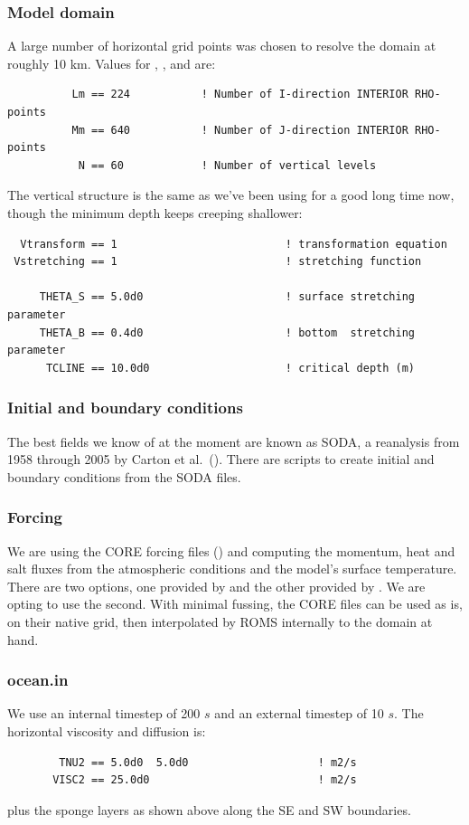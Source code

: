 \subsubsection{Model domain}
A large number of horizontal grid points was chosen to resolve the
domain at roughly 10 km. Values for , , and
 are:
\begin{verbatim}
          Lm == 224           ! Number of I-direction INTERIOR RHO-points
          Mm == 640           ! Number of J-direction INTERIOR RHO-points
           N == 60            ! Number of vertical levels
\end{verbatim}
The vertical structure is the same as we've been using for a good
long time now, though the minimum depth keeps creeping shallower:
\begin{verbatim}
  Vtransform == 1                          ! transformation equation
 Vstretching == 1                          ! stretching function

     THETA_S == 5.0d0                      ! surface stretching parameter
     THETA_B == 0.4d0                      ! bottom  stretching parameter
      TCLINE == 10.0d0                     ! critical depth (m)
\end{verbatim}

\subsubsection{Initial and boundary conditions}
The best fields we know of at the moment are known as SODA, a
reanalysis from 1958 through 2005 by Carton et al.\
(\cite{Carton_2005}). There are  scripts to create
initial and boundary conditions from the SODA files.

\subsubsection{Forcing}
We are using the CORE forcing files (\cite{Large_08}) and computing the
momentum, heat and salt fluxes from the atmospheric conditions and the
model's surface temperature. There are two options, one provided by
\code{bulk\_flux.F} and the other provided by \code{ccsm\_flux}. We
are opting to use the second. With minimal fussing, the CORE files
can be used as is, on their native grid, then interpolated by ROMS
internally to the domain at hand.

\subsubsection{ocean.in}
We use an internal timestep of 200 $s$ and an external timestep of 10
$s$. The horizontal viscosity and diffusion is:
\begin{verbatim}
        TNU2 == 5.0d0  5.0d0                    ! m2/s
       VISC2 == 25.0d0                          ! m2/s
\end{verbatim}
plus the sponge layers as shown above along the SE and SW boundaries.

